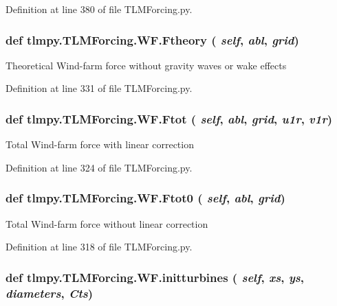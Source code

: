 Definition at line 380 of file TLMForcing.py.\hypertarget{classtlmpy_1_1TLMForcing_1_1WF_a9cb8687f5f0c49a522c21e70fadad467}{
\subsubsection[{Ftheory}]{\setlength{\rightskip}{0pt plus 5cm}def tlmpy.TLMForcing.WF.Ftheory ( {\em self}, \/   {\em abl}, \/   {\em grid})}}
\label{classtlmpy_1_1TLMForcing_1_1WF_a9cb8687f5f0c49a522c21e70fadad467}
\begin{DoxyVerb}Theoretical Wind-farm force without gravity waves or wake effects\end{DoxyVerb}
 

Definition at line 331 of file TLMForcing.py.\hypertarget{classtlmpy_1_1TLMForcing_1_1WF_a754edaddbd51e5bc52e7dc8d2ece57e3}{
\subsubsection[{Ftot}]{\setlength{\rightskip}{0pt plus 5cm}def tlmpy.TLMForcing.WF.Ftot ( {\em self}, \/   {\em abl}, \/   {\em grid}, \/   {\em u1r}, \/   {\em v1r})}}
\label{classtlmpy_1_1TLMForcing_1_1WF_a754edaddbd51e5bc52e7dc8d2ece57e3}
\begin{DoxyVerb}Total Wind-farm force with linear correction\end{DoxyVerb}
 

Definition at line 324 of file TLMForcing.py.\hypertarget{classtlmpy_1_1TLMForcing_1_1WF_a4a345711d9464272d7eb34144f33f9d6}{
\subsubsection[{Ftot0}]{\setlength{\rightskip}{0pt plus 5cm}def tlmpy.TLMForcing.WF.Ftot0 ( {\em self}, \/   {\em abl}, \/   {\em grid})}}
\label{classtlmpy_1_1TLMForcing_1_1WF_a4a345711d9464272d7eb34144f33f9d6}
\begin{DoxyVerb}Total Wind-farm force without linear correction\end{DoxyVerb}
 

Definition at line 318 of file TLMForcing.py.\hypertarget{classtlmpy_1_1TLMForcing_1_1WF_a3ab7aa7b283a781d8b72520592c73297}{
\subsubsection[{initturbines}]{\setlength{\rightskip}{0pt plus 5cm}def tlmpy.TLMForcing.WF.initturbines ( {\em self}, \/   {\em xs}, \/   {\em ys}, \/   {\em diameters}, \/   {\em Cts})}}
\label{classtlmpy_1_1TLMForcing_1_1WF_a3ab7aa7b283a781d8b72520592c73297}


